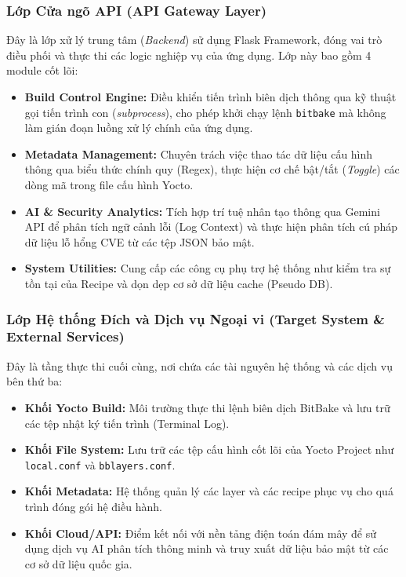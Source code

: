 \subsubsection{Lớp Cửa ngõ API (API Gateway Layer)}

Đây là lớp xử lý trung tâm (\textit{Backend}) sử dụng Flask Framework, đóng vai trò điều phối và thực thi các logic nghiệp vụ của ứng dụng. Lớp này bao gồm 4 module cốt lõi:

\begin{itemize}
    \item \textbf{Build Control Engine:} Điều khiển tiến trình biên dịch thông qua kỹ thuật gọi tiến trình con (\textit{subprocess}), cho phép khởi chạy lệnh \texttt{bitbake} mà không làm gián đoạn luồng xử lý chính của ứng dụng.

    \item \textbf{Metadata Management:} Chuyên trách việc thao tác dữ liệu cấu hình thông qua biểu thức chính quy (Regex), thực hiện cơ chế bật/tắt (\textit{Toggle}) các dòng mã trong file cấu hình Yocto.

    \item \textbf{AI \& Security Analytics:} Tích hợp trí tuệ nhân tạo thông qua Gemini API để phân tích ngữ cảnh lỗi (Log Context) và thực hiện phân tích cú pháp dữ liệu lỗ hổng CVE từ các tệp JSON bảo mật.

    \item \textbf{System Utilities:} Cung cấp các công cụ phụ trợ hệ thống như kiểm tra sự tồn tại của Recipe và dọn dẹp cơ sở dữ liệu cache (Pseudo DB).
\end{itemize}

\subsubsection{Lớp Hệ thống Đích và Dịch vụ Ngoại vi (Target System \& External Services)}

Đây là tầng thực thi cuối cùng, nơi chứa các tài nguyên hệ thống và các dịch vụ bên thứ ba:

\begin{itemize}
    \item \textbf{Khối Yocto Build:} Môi trường thực thi lệnh biên dịch BitBake và lưu trữ các tệp nhật ký tiến trình (Terminal Log).

    \item \textbf{Khối File System:} Lưu trữ các tệp cấu hình cốt lõi của Yocto Project như \texttt{local.conf} và \texttt{bblayers.conf}.

    \item \textbf{Khối Metadata:} Hệ thống quản lý các layer và các recipe phục vụ cho quá trình đóng gói hệ điều hành.

    \item \textbf{Khối Cloud/API:} Điểm kết nối với nền tảng điện toán đám mây để sử dụng dịch vụ AI phân tích thông minh và truy xuất dữ liệu bảo mật từ các cơ sở dữ liệu quốc gia.
\end{itemize}

